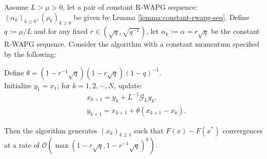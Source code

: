 \documentclass[12pt]{article}
\begin{document}
    \begin{theorem}\label{thm:fixed-momentum-fista}
        Assume $L > \mu > 0$, let a pair of constant R-WAPG sequence: $(\alpha_k)_{k \ge0}, (\rho_k)_{k \ge 0}$ be given by Lemma \ref{lemma:constant-rwapg-seq}.
        Define $q := \mu/L$ and for any fixed $r \in \left(\sqrt{q}, \sqrt{q^{-1}}\right)$, let $\alpha_k := \alpha = r \sqrt{q}$ be the constant R-WAPG sequence. 
        Consider the algorithm with a constant momentum specified by the following: 
        \begin{tcolorbox}
            Define $\theta = \left(1 - r^{-1}\sqrt{q}\right)(1 - r\sqrt{q})(1 - q)^{-1}$. 
            \\
            Initialize $y_1 = x_1$; for $k = 1, 2, \cdots, N$, update: 
            \begin{align*}
                &x_{k + 1} = y_k + L^{-1}\mathcal G_L y_k, 
                \\
                & y_{k + 1} = x_{k + 1} + \theta(x_{k + 1} - x_k). 
            \end{align*}
        \end{tcolorbox}
        Then the algorithm generates $(x_k)_{k \ge 1}$ such that $F(x) - F(x^*)$ convergences at a rate of $\mathcal O\left(\max(1 - r\sqrt{q}, 1 - r^{-1}\sqrt{q})^k\right)$. 
    \end{theorem}
\end{document}

